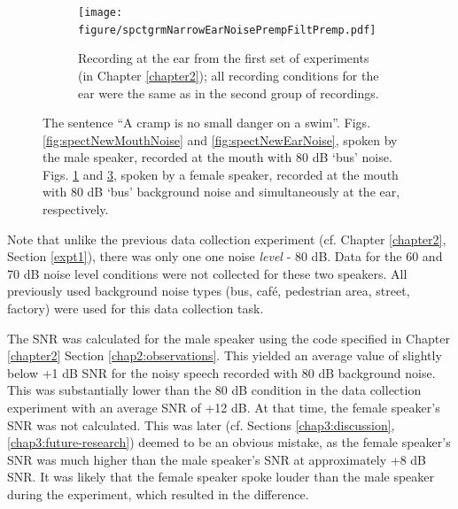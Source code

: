 \begin{figure}[h!]
\begin{subfigure}{0.45\textwidth}
  \label{fig:spectOldMouthNoise}
\end{subfigure}
\qquad
\begin{subfigure}{0.45\textwidth}
  \centering
  \texttt{[image: figure/spctgrmNarrowEarNoisePrempFiltPremp.pdf]}
  \caption{Recording at the ear from the first set of experiments (in Chapter \ref{chapter2}); all recording conditions for the ear were the same as in the second group of recordings.}
  \label{fig:spectOldEarNoise}
\end{subfigure}
\caption{The sentence ``A cramp is no small danger on a swim''. \DIFdelbeginFL {}\DIFdelendFL \DIFaddbeginFL {}\DIFaddendFL Figs. \ref{fig:spectNewMouthNoise} and \ref{fig:spectNewEarNoise}, spoken by the male speaker, recorded at the mouth \DIFaddbeginFL {}\DIFaddendFL with 80 dB `bus' \DIFaddbeginFL {}\DIFaddendFL noise\DIFdelbeginFL {}\DIFdelendFL .  \DIFdelbeginFL {}\DIFdelendFL \DIFaddbeginFL {}\DIFaddendFL Figs. \ref{fig:spectOldMouthNoise} and \ref{fig:spectOldEarNoise}, spoken by a female speaker, recorded at the mouth with 80 dB `bus' background noise and simultaneously at the ear, respectively.}
\end{figure}

Note that unlike the previous data collection experiment (cf. Chapter \ref{chapter2}, Section \ref{expt1}), there was only one one noise \textit{level} - 80 dB.  Data for the 60 and 70 dB noise level conditions were not collected for these two speakers.  All previously used background noise types (bus, caf\'{e}, pedestrian area, street, factory) were used for this data collection task\DIFdelbegin {}\DIFdelend .

The SNR was calculated for the male speaker using the code specified in Chapter \ref{chapter2} Section \ref{chap2:observations}.  This yielded an average value of slightly below +1 dB SNR for the noisy speech recorded with 80 dB background noise.  This was substantially lower than the 80 dB condition in the data collection experiment with an average SNR of +12 dB.  At that time, the female speaker's SNR was not calculated.  This was later (cf. Sections \ref{chap3:discussion}, \ref{chap3:future-research}) deemed to be an obvious mistake, as the female speaker's SNR was much higher than the male speaker's SNR at approximately +8 dB SNR.  It was likely that the female speaker spoke louder than the male speaker during the experiment, which resulted in the difference.



